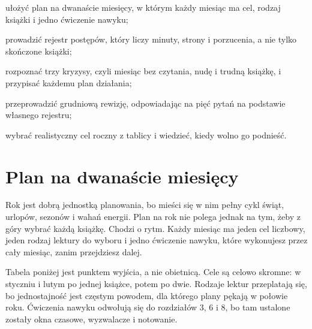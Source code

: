 
\begin{cele}
\item ułożyć plan na dwanaście miesięcy, w którym każdy miesiąc ma cel, rodzaj książki i jedno ćwiczenie nawyku;
\item prowadzić rejestr postępów, który liczy minuty, strony i porzucenia, a nie tylko skończone książki;
\item rozpoznać trzy kryzysy, czyli miesiąc bez czytania, nudę i trudną książkę, i przypisać każdemu plan działania;
\item przeprowadzić grudniową rewizję, odpowiadając na pięć pytań na podstawie własnego rejestru;
\item wybrać realistyczny cel roczny z tablicy i wiedzieć, kiedy wolno go podnieść.
\end{cele}

\section{Plan na dwanaście miesięcy}

Rok jest dobrą jednostką planowania, bo mieści się w nim pełny cykl świąt, urlopów, sezonów i wahań energii. Plan na rok nie polega jednak na tym, żeby z góry wybrać każdą książkę. Chodzi o rytm. Każdy miesiąc ma jeden cel liczbowy, jeden rodzaj lektury do wyboru i jedno ćwiczenie nawyku, które wykonujesz przez cały miesiąc, zanim przejdziesz dalej.

Tabela poniżej jest punktem wyjścia, a nie obietnicą. Cele są celowo skromne: w styczniu i lutym po jednej książce, potem po dwie. Rodzaje lektur przeplatają się, bo jednostajność jest częstym powodem, dla którego plany pękają w połowie roku.  Ćwiczenia nawyku odwołują się do rozdziałów 3, 6 i 8, bo tam ustalone zostały okna czasowe, wyzwalacze i notowanie.

